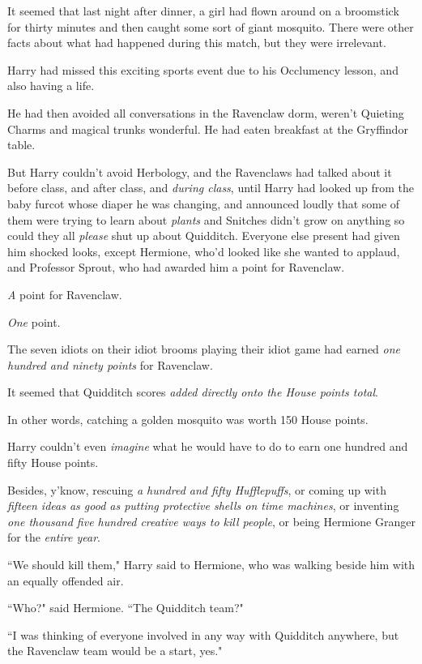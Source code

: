 It seemed that last night after dinner, a girl had flown around on a broomstick for thirty minutes and then caught some sort of giant mosquito. There were other facts about what had happened during this match, but they were irrelevant.

Harry had missed this exciting sports event due to his Occlumency lesson, and also having a life.

He had then avoided all conversations in the Ravenclaw dorm, weren't Quieting Charms and magical trunks wonderful. He had eaten breakfast at the Gryffindor table.

But Harry couldn't avoid Herbology, and the Ravenclaws had talked about it before class, and after class, and \emph{during class}, until Harry had looked up from the baby furcot whose diaper he was changing, and announced loudly that some of them were trying to learn about \emph{plants} and Snitches didn't grow on anything so could they all \emph{please} shut up about Quidditch. Everyone else present had given him shocked looks, except Hermione, who'd looked like she wanted to applaud, and Professor Sprout, who had awarded him a point for Ravenclaw.

\emph{A} point for Ravenclaw.

\emph{One} point.

The seven idiots on their idiot brooms playing their idiot game had earned \emph{one hundred and ninety points} for Ravenclaw.

It seemed that Quidditch scores \emph{added directly onto the House points total}.

In other words, catching a golden mosquito was worth 150 House points.

Harry couldn't even \emph{imagine} what he would have to do to earn one hundred and fifty House points.

Besides, y'know, rescuing \emph{a hundred and fifty Hufflepuffs}, or coming up with \emph{fifteen ideas as good as putting protective shells on time machines}, or inventing \emph{one thousand five hundred creative ways to kill people}, or being Hermione Granger for the \emph{entire year}.

``We should kill them," Harry said to Hermione, who was walking beside him with an equally offended air.

``Who?" said Hermione. ``The Quidditch team?"

``I was thinking of everyone involved in any way with Quidditch anywhere, but the Ravenclaw team would be a start, yes."

